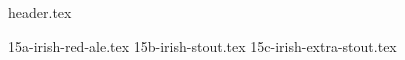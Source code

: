 \clearpage
{}
\divisorLine

{header.tex}

\begin{multicols}{2}

{15a-irish-red-ale.tex}
{15b-irish-stout.tex}
{15c-irish-extra-stout.tex}

\end{multicols}